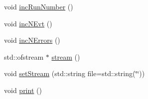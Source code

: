 \begin{DoxyCompactItemize}
\item 
void \hyperlink{classOptions_a0bf512fc9126cd76acabaa4c3b65d7fb}{inc\+Run\+Number} ()
\item 
void \hyperlink{classOptions_aa950f9861182c76c4005668e0b7f012a}{inc\+N\+Evt} ()
\item 
void \hyperlink{classOptions_ae5d12fb2571255033ef6b35300921b39}{inc\+N\+Errors} ()
\item 
std\+::ofstream $\ast$ \hyperlink{classOptions_acfc9aa4c7dc41691571f2b37d3fe86af}{stream} ()
\item 
void \hyperlink{classOptions_af7df7a64e597f0bed79ca979f8144daa}{set\+Stream} (std\+::string file=std\+::string(\char`\"{}\char`\"{}))
\item 
void \hyperlink{classOptions_a3f4593f64bc8c8afc3ade9237adb83e1}{print} ()
\end{DoxyCompactItemize}
